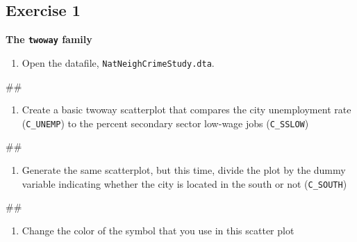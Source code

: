 \documentclass[
]{book}
\newenvironment{Shaded}{\begin{snugshade}}{\end{snugshade}}
\newcommand{\NormalTok}[1]{#1}
\providecommand{\tightlist}{%
  \setlength{\itemsep}{0pt}\setlength{\parskip}{0pt}}
\begin{document}
\hypertarget{exercise-1-9}{%
\subsection{Exercise 1}\label{exercise-1-9}}

\textbf{The \texttt{twoway} family}

\begin{enumerate}
\def\labelenumi{\arabic{enumi}.}
\tightlist
\item
  Open the datafile, \texttt{NatNeighCrimeStudy.dta}.
\end{enumerate}

\begin{Shaded}
\begin{Highlighting}[]
\NormalTok{\#\#}
\end{Highlighting}
\end{Shaded}

\begin{enumerate}
\def\labelenumi{\arabic{enumi}.}
\setcounter{enumi}{1}
\tightlist
\item
  Create a basic twoway scatterplot that compares the city unemployment rate (\texttt{C\_UNEMP}) to the percent secondary sector low-wage jobs (\texttt{C\_SSLOW})
\end{enumerate}

\begin{Shaded}
\begin{Highlighting}[]
\NormalTok{\#\#}
\end{Highlighting}
\end{Shaded}

\begin{enumerate}
\def\labelenumi{\arabic{enumi}.}
\setcounter{enumi}{2}
\tightlist
\item
  Generate the same scatterplot, but this time, divide the plot by the dummy variable indicating whether the city is located in the south or not (\texttt{C\_SOUTH})
\end{enumerate}

\begin{Shaded}
\begin{Highlighting}[]
\NormalTok{\#\#}
\end{Highlighting}
\end{Shaded}

\begin{enumerate}
\def\labelenumi{\arabic{enumi}.}
\setcounter{enumi}{3}
\tightlist
\item
  Change the color of the symbol that you use in this scatter plot
\end{enumerate}
\end{document}
